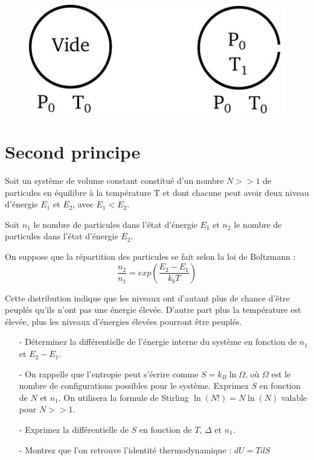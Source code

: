 \documentclass{report}
\begin{document}
\begin{figure}[!h]
\centering
\includegraphics[width=0.5\linewidth]{ampoule.pdf}
\end{figure}

\section*{Second principe}

Soit un système de volume constant constitué d'un nombre $N>>1$ de particules en équilibre à la température T et dont chacune peut avoir deux niveau d'énergie $E_{1}$ et $E_{2}$, avec $E_{1}<E_{2}$.

Soit $n_{1}$ le nombre de particules dans l'état d'énergie $E_{1}$ et $n_{2}$ le nombre de particules dans l'état d'énergie $E_{2}$.

On suppose que la répartition des particules se fait selon la loi de Boltzmann :
\begin{equation}
\frac{n_{2}}{n_{1}}=exp\left( \frac{E_{2}-E_{1}}{k_{b}T}\right) 
\end{equation}

Cette distribution indique que les niveaux ont d'autant plus de chance d'être peuplés qu'ils n'ont pas une énergie élevée. D'autre part plus la température est élevée, plus les niveaux d'énergies élevées pourront être peuplés. 

\begin{itemize}
\item[-]Déterminez la différentielle de l'énergie interne du système en fonction de $n_{1}$ et $E_{2}-E_{1}$.
\item[-]On rappelle que l'entropie peut s'écrire comme $S=k_B\ln\Omega$, où $\Omega$ est le nombre de configurations possibles pour le système. Exprimez $S$ en fonction de $N$ et $n_1$. On utilisera la formule de Stirling $\ln (N!)=N \ln (N)$ valable pour $N>>1$.
\item[-] Exprimez la différentielle de $S$ en fonction de $T$, $\Delta$ et $n_1$.
\item[-] Montrez que l'on retrouve l'identité thermodynamique : $dU = TdS$
\end{itemize}

\newpage
\end{document}
